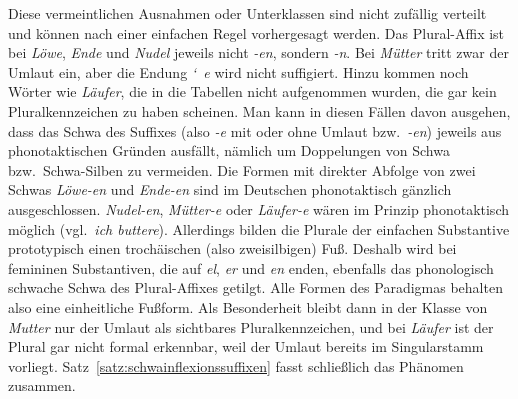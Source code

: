 \begin{table}[!htbp]
  \centering
  \caption{Volle und um Schwa reduzierte Plural-Affixe}
  \label{tab:schwaimplural}
\end{table}

Diese vermeintlichen Ausnahmen oder Unterklassen sind nicht zufällig verteilt und können nach einer einfachen Regel vorhergesagt werden.
Das Plural-Affix ist bei \textit{Löwe}, \textit{Ende} und \textit{Nudel} jeweils nicht \textit{-en}, sondern \textit{-n}.
Bei \textit{Mütter} tritt zwar der Umlaut ein, aber die Endung \textit{\char`~e} wird nicht suffigiert.
Hinzu kommen noch Wörter wie \textit{Läufer}, die in die Tabellen nicht aufgenommen wurden, die gar kein Pluralkennzeichen zu haben scheinen.
Man kann in diesen Fällen davon ausgehen, dass das Schwa des Suffixes (also \textit{-e} mit oder ohne Umlaut bzw.\ \textit{-en}) jeweils aus phonotaktischen Gründen ausfällt, nämlich um Doppelungen von Schwa bzw.\ Schwa-Silben zu vermeiden.
Die Formen mit direkter Abfolge von zwei Schwas \textit{\Ast Löwe-en} und \textit{\Ast Ende-en} sind im Deutschen phonotaktisch gänzlich ausgeschlossen.
\textit{\Ast Nudel-en}, \textit{\Ast Mütter-e} oder \textit{\Ast Läufer-e} wären im Prinzip phonotaktisch möglich (vgl.\ \textit{ich buttere}).
Allerdings bilden die Plurale der einfachen Substantive prototypisch einen trochäischen (also zweisilbigen) Fuß.
Deshalb wird bei femininen Substantiven, die auf \textit{el}, \textit{er} und \textit{en} enden, ebenfalls das phonologisch schwache Schwa des Plural-Affixes getilgt.
Alle Formen des Paradigmas behalten also eine einheitliche Fußform.
Als Besonderheit bleibt dann in der Klasse von \textit{Mutter} nur der Umlaut als sichtbares Pluralkennzeichen, und bei \textit{Läufer} ist der Plural gar nicht formal erkennbar, weil der Umlaut bereits im Singularstamm vorliegt.
Satz~\ref{satz:schwainflexionssuffixen} fasst schließlich das Phänomen zusammen.


